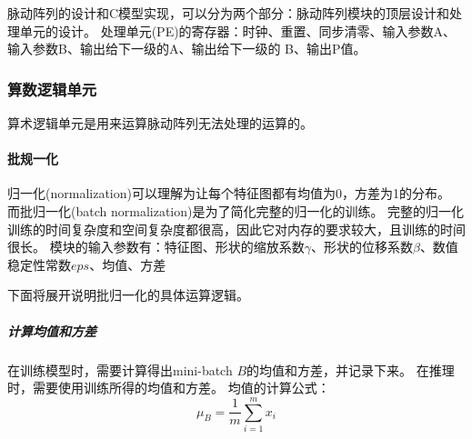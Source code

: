 
  
脉动阵列的设计和C模型实现，可以分为两个部分：脉动阵列模块的顶层设计和处理单元的设计。
处理单元(PE)的寄存器：时钟、重置、同步清零、输入参数A、输入参数B、输出给下一级的A、输出给下一级的
B、输出P值。


\subsubsection{算数逻辑单元}
算术逻辑单元是用来运算脉动阵列无法处理的运算的。

\paragraph{批规一化}
归一化(normalization)可以理解为让每个特征图都有均值为0，方差为1的分布。
而批归一化(batch normalization)是为了简化完整的归一化的训练。
完整的归一化训练的时间复杂度和空间复杂度都很高，因此它对内存的要求较大，且训练的时间很长。
模块的输入参数有：特征图、形状的缩放系数$\gamma$、形状的位移系数$\beta$、数值稳定性常数$eps$、均值、方差

下面将展开说明批归一化的具体运算逻辑。
\subparagraph{计算均值和方差}
在训练模型时，需要计算得出mini-batch $B$的均值和方差，并记录下来。
在推理时，需要使用训练所得的均值和方差。  
均值的计算公式：
$$ \mu_{B} = \frac{1}{m} \sum_{i=1}^{m}x_{i} $$  

